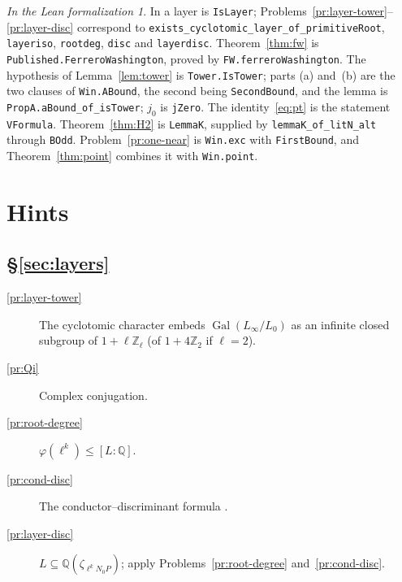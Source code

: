 \documentclass[reqno]{amsart}
\theoremstyle{definition}
\theoremstyle{plain}
\theoremstyle{remark}
\newtheorem*{leanremark}{In the Lean formalization}
\newcommand{\Z}{\mathbb{Z}}
\newcommand{\Q}{\mathbb{Q}}
\newcommand{\Zl}{\Z_\ell}
\newcommand{\Gal}{\operatorname{Gal}}
\newcommand{\tl}[1]{\texttt{#1}}
\begin{document}
\begin{leanremark}
\raggedright In \cite{Lean} a layer is \tl{IsLayer}; Problems~\ref{pr:layer-tower}--\ref{pr:layer-disc} correspond to \tl{exists\_\allowbreak{}cyclotomic\_\allowbreak{}layer\_\allowbreak{}of\_\allowbreak{}primitiveRoot}, \tl{layeriso}, \tl{rootdeg}, \tl{disc} and \tl{layerdisc}.  Theorem~\ref{thm:fw} is \tl{Published.\allowbreak{}FerreroWashington}, proved by \tl{FW.\allowbreak{}ferreroWashington}.  The hypothesis of Lemma~\ref{lem:tower} is \tl{Tower.\allowbreak{}IsTower}; parts (a) and~(b) are the two clauses of \tl{Win.\allowbreak{}ABound}, the second being \tl{SecondBound}, and the lemma is \tl{PropA.\allowbreak{}aBound\_\allowbreak{}of\_\allowbreak{}isTower}; \(j_0\) is \tl{jZero}.  The identity~\eqref{eq:pt} is the statement \tl{VFormula}.  Theorem~\ref{thm:H2} is \tl{LemmaK}, supplied by \tl{lemmaK\_\allowbreak{}of\_\allowbreak{}litN\_\allowbreak{}alt} through \tl{BOdd}.  Problem~\ref{pr:one-near} is \tl{Win.\allowbreak{}exc} with \tl{FirstBound}, and Theorem~\ref{thm:point} combines it with \tl{Win.\allowbreak{}point}.
\end{leanremark}

\section*{Hints}

\subsection*{\S\ref{sec:layers}}
\begin{description}
\item[\ref{pr:layer-tower}] The cyclotomic character embeds \(\Gal(L_\infty/L_0)\) as an infinite closed subgroup of \(1+\ell\Zl\) (of \(1+4\Z_2\) if \(\ell=2\)).
\item[\ref{pr:Qi}] Complex conjugation.
\item[\ref{pr:root-degree}] \(\varphi(\ell^k)\le[L:\Q]\).
\item[\ref{pr:cond-disc}] The conductor--discriminant formula \cite[Ch.~3]{Wa}.
\item[\ref{pr:layer-disc}] \(L\subseteq\Q(\zeta_{\ell^kN_0P})\); apply Problems~\ref{pr:root-degree} and~\ref{pr:cond-disc}.
\end{description}
\end{document}
